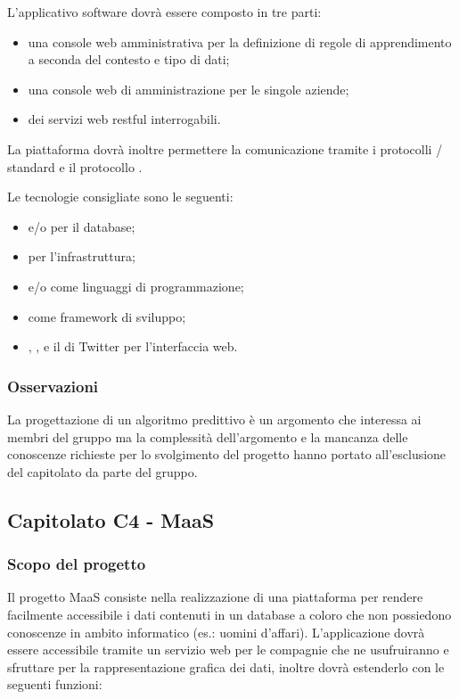 L'applicativo software dovrà essere composto in tre parti:
\begin{itemize}
	\item una console web amministrativa per la definizione di regole di apprendimento a seconda del contesto e tipo di dati;
	\item una console web di amministrazione per le singole aziende;
	\item dei servizi web restful  interrogabili.
\end{itemize}
La piattaforma dovrà inoltre permettere la comunicazione tramite i protocolli / standard e il protocollo .


Le tecnologie consigliate sono le seguenti:
\begin{itemize}
	\item {} e/o  per il database;
	\item {} per l'infrastruttura;
	\item {} e/o  come linguaggi di programmazione;
	\item {} come framework di sviluppo;
	\item {}, ,  e il  di Twitter per l'interfaccia web.
\end{itemize}

\subsubsection{Osservazioni}
La progettazione di un algoritmo predittivo è un argomento che interessa ai membri del gruppo ma la complessità dell'argomento e la mancanza delle conoscenze
richieste per lo svolgimento del progetto hanno portato all'esclusione del capitolato da parte del gruppo.



\subsection{Capitolato C4 - MaaS}
\subsubsection{Scopo del progetto}
Il progetto MaaS consiste nella realizzazione di una piattaforma per rendere facilmente accessibile i dati contenuti in un database a coloro che non possiedono conoscenze in ambito informatico (es.: uomini d'affari).
L'applicazione dovrà essere accessibile tramite un servizio web per le compagnie che ne usufruiranno e sfruttare  per la rappresentazione grafica dei dati, inoltre dovrà estenderlo con le seguenti funzioni:

